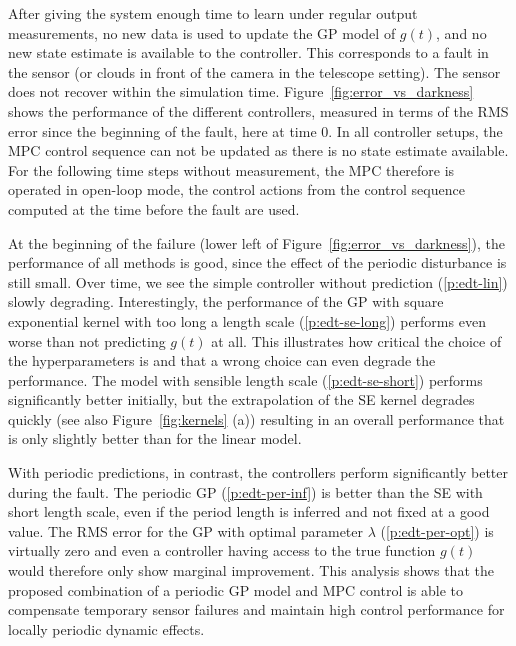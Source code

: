 After giving the system enough time to learn under regular output measurements,
no new data is used to update the GP model of $g(t)$, and no new state estimate
is available to the controller. This corresponds to a fault in the sensor (or
clouds in front of the camera in the telescope setting). The sensor does not
recover within the simulation time. Figure~\ref{fig:error_vs_darkness} shows
the performance of the different controllers, measured in terms of the RMS
error since the beginning of the fault, here at time $0$. In all controller
setups, the MPC control sequence can not be updated as there is no state
estimate available. For the following time steps without measurement, the MPC
therefore is operated in open-loop mode, \ie the control actions from the
control sequence computed at the time before the fault are used.

At the beginning of the failure (lower left of
Figure~\ref{fig:error_vs_darkness}), the performance of all methods is good,
since the effect of the periodic disturbance is still small. Over time, we see
the simple controller without prediction (\ref*{p:edt-lin}) slowly degrading.
Interestingly, the performance of the GP with square exponential kernel with
too long a length scale (\ref*{p:edt-se-long}) performs even worse than not
predicting $g(t)$ at all. This illustrates how critical the choice of the
hyperparameters is and that a wrong choice can even degrade the performance.
The model with sensible length scale (\ref*{p:edt-se-short}) performs
significantly better initially, but the extrapolation of the SE kernel degrades
quickly (see also Figure~\ref{fig:kernels} (a)) resulting in an overall
performance that is only slightly better than for the linear model.

With periodic predictions, in contrast, the controllers perform significantly
better during the fault. The periodic GP (\ref*{p:edt-per-inf}) is better than
the SE with short length scale, even if the period length is inferred and not
fixed at a good value. The RMS error for the GP with optimal parameter
$\lambda$ (\ref*{p:edt-per-opt}) is virtually zero and even a controller having
access to the true function $g(t)$ would therefore only show marginal
improvement. This analysis shows that the proposed combination of a periodic GP
model and MPC control is able to compensate temporary sensor failures and
maintain high control performance for locally periodic dynamic effects.

